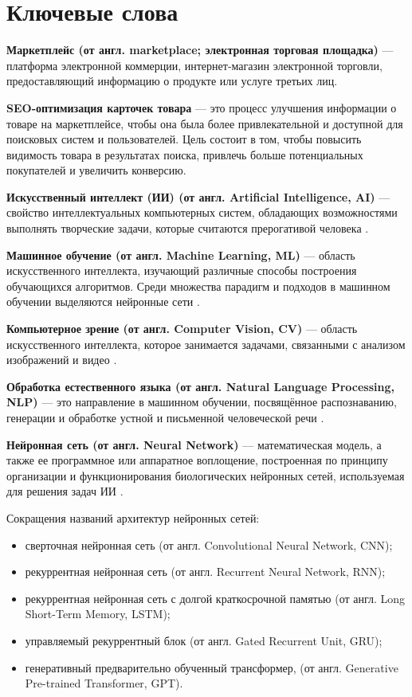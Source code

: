 \documentclass[a4paper,12pt]{extarticle}
\begin{document}
\newpage
\section*{Ключевые слова}   %

\textbf{Маркетплейс (от англ. marketplace; электронная торговая площадка)} — платформа электронной коммерции, интернет-магазин электронной торговли, предоставляющий информацию о продукте или услуге третьих лиц.

\textbf{SEO-оптимизация карточек товара} — это процесс улучшения информации о товаре на маркетплейсе, чтобы она была более привлекательной и доступной для поисковых систем и пользователей. Цель состоит в том, чтобы повысить видимость товара в результатах поиска, привлечь больше потенциальных покупателей и увеличить конверсию.

\textbf{Искусственный интеллект (ИИ) (от англ. Artificial Intelligence, AI)} — свойство интеллектуальных компьютерных систем, обладающих возможностями выполнять творческие задачи, которые считаются прерогативой человека \cite{ai}.

\textbf{Машинное обучение (от англ. Machine Learning, ML)} — область искусственного интеллекта, изучающий различные способы построения обучающихся алгоритмов. Среди множества парадигм и подходов в машинном обучении выделяются нейронные сети \cite{ml}. 

\textbf{Компьютерное зрение (от англ. Computer Vision, CV)} — область искусственного интеллекта, которое занимается задачами, связанными с анализом изображений и видео \cite{cv}.

\textbf{Обработка естественного языка (от англ. Natural Language Processing, NLP)} — это направление в машинном обучении, посвящённое распознаванию, генерации и обработке устной и письменной человеческой речи \cite{nlp}.

\textbf{Нейронная сеть (от англ. Neural Network)} — математическая модель, а также ее программное или аппаратное воплощение, построенная по принципу организации и функционирования биологических нейронных сетей, используемая для решения задач ИИ \cite{neural}.

Сокращения названий архитектур нейронных сетей:
\begin{itemize}
	\item сверточная нейронная сеть (от англ. Convolutional Neural Network, CNN);
	\item рекуррентная нейронная сеть (от англ. Recurrent Neural Network, RNN);
	\item рекуррентная нейронная сеть с долгой краткосрочной памятью (от англ. Long Short-Term Memory, LSTM);
	\item управляемый рекуррентный блок (от англ. Gated Recurrent Unit, GRU);
	\item генеративный предварительно обученный трансформер, (от англ. Generative Pre-trained Transformer, GPT).
\end{itemize}
\end{document}
